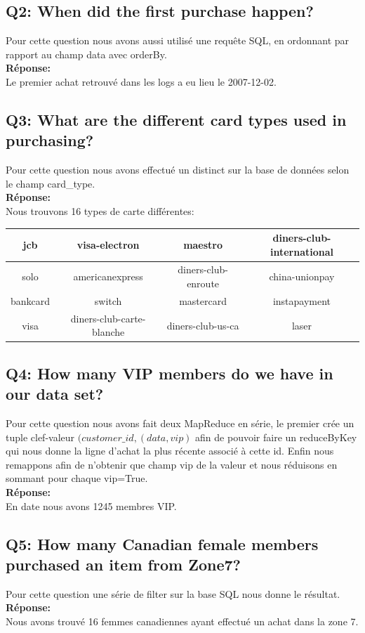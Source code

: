 \documentclass[11pt]{article}
\begin{document}
\subsection*{Q2: When did the first purchase happen?}
	Pour cette question nous avons aussi utilisé une requête SQL, en
	ordonnant par rapport au champ data avec orderBy.\\
	\textbf{Réponse:\\}
	Le premier achat retrouvé dans les logs a eu lieu le 2007-12-02.

\subsection*{Q3: What are the different card types used in purchasing?}
	Pour cette question nous avons effectué un distinct sur la base
	de données selon le champ card\_type.\\
	\textbf{Réponse:\\}
	Nous trouvons 16 types de carte différentes:
	\begin{center}
	\begin{tabular}{|c|c|c|c|}
		\hline
		jcb & visa-electron & maestro & diners-club-international \\
		\hline
		solo & americanexpress & diners-club-enroute & china-unionpay \\
		\hline
		bankcard & switch & mastercard & instapayment \\
		\hline
		visa & diners-club-carte-blanche & diners-club-us-ca & laser \\
		\hline
	\end{tabular}
	\end{center}
\subsection*{Q4: How many VIP members do we have in our data set?}
	Pour cette question nous avons fait deux MapReduce en série, le
	premier crée un tuple clef-valeur $(customer\_id, (data, vip)$ afin
	de pouvoir faire un reduceByKey qui nous donne la ligne d'achat 
	la plus récente associé à cette id. Enfin nous remappons afin de
	n'obtenir que champ vip de la valeur et nous réduisons en sommant
	pour chaque vip=True.\\
	\textbf{Réponse:\\}
	En date nous avons 1245 membres VIP.\\
\subsection*{Q5: How many Canadian female members purchased an item from Zone7?}
	Pour cette question une série de filter sur la base SQL nous donne
	le résultat.\\
	\textbf{Réponse:\\}
	Nous avons trouvé 16 femmes canadiennes ayant effectué un achat dans la
	zone 7.
\end{document}
